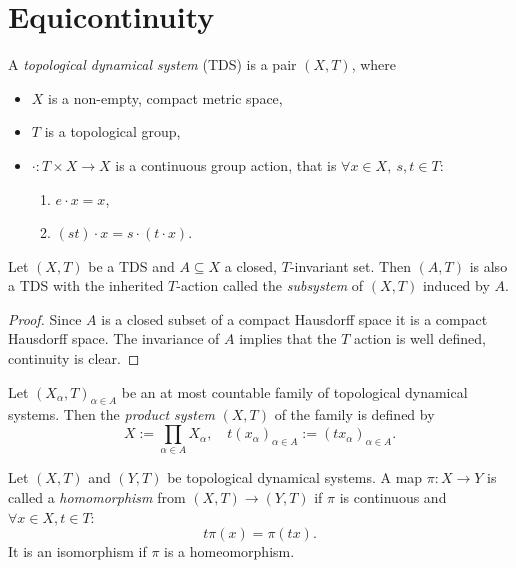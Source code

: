 \section{Equicontinuity}

\begin{definition}
	A \emph{topological dynamical system} (TDS) is a pair $(X, T)$, where
	\begin{itemize}
		\item $X$ is a non-empty, compact metric space,
		\item $T$ is a topological group,
		\item $\cdot : T \times  X \to X$ is a continuous group action, that is $\forall x \in X, \ s,t \in T$: 
		\begin{enumerate}
			\item $ e \cdot x = x$,
			\item $(st)\cdot x = s \cdot (t \cdot x)$.
		\end{enumerate}
	\end{itemize}
\end{definition}

\begin{proposition}[Subsystem]
	Let $(X, T)$ be a TDS and $A \subseteq X$ a closed, $T$-invariant set.
	Then $(A, T)$ is also a TDS with the inherited $T$-action called the \emph{subsystem} of $(X, T)$ induced by $A$.
\end{proposition}
\begin{proof}
	Since $A$ is a closed subset of a compact Hausdorff space it is a compact Hausdorff space. The invariance of $A$ implies that the $T$ action is well defined, continuity is clear. 
\end{proof}

\begin{definition}
	Let $(X_\alpha, T)_{\alpha \in A}$ be an at most countable family of topological dynamical systems. Then the \emph{product system} $(X, T)$ of the family is defined by
	\begin{equation*}
		X := \prod_{\alpha \in A} X_\alpha, \quad t (x_\alpha)_{\alpha \in A} := (t x_\alpha)_{\alpha \in A}.
	\end{equation*}
\end{definition}

\begin{definition}
	Let $(X, T)$ and $(Y,T)$ be topological dynamical systems. A map $\pi : X \to Y$ is called a \emph{homomorphism} from $(X, T) \to (Y, T)$ if $\pi$ is continuous and $\forall x \in X, t \in T$:
	\begin{equation*}
		t \pi (x) = \pi(tx).
	\end{equation*}
	It is an isomorphism if $\pi$ is a homeomorphism.
\end{definition}

